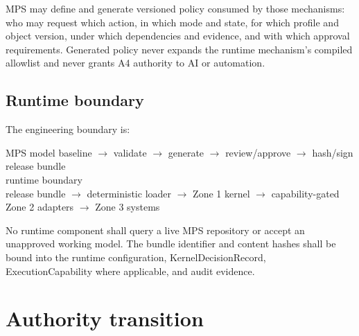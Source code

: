 \documentclass[11pt,letterpaper]{article}
\begin{document}
MPS may define and generate versioned policy consumed by those mechanisms: who may request which action, in which mode and state, for which profile and object version, under which dependencies and evidence, and with which approval requirements. Generated policy never expands the runtime mechanism's compiled allowlist and never grants A4 authority to AI or automation.

\subsection{Runtime boundary}

The engineering boundary is:

\begin{center}
\begin{minipage}{0.90\textwidth}
\ttfamily\small
MPS model baseline $\rightarrow$ validate $\rightarrow$ generate $\rightarrow$ review/approve $\rightarrow$ hash/sign release bundle\\
\hfill runtime boundary\\
release bundle $\rightarrow$ deterministic loader $\rightarrow$ Zone 1 kernel $\rightarrow$ capability-gated Zone 2 adapters $\rightarrow$ Zone 3 systems
\end{minipage}
\end{center}

No runtime component shall query a live MPS repository or accept an unapproved working model. The bundle identifier and content hashes shall be bound into the runtime configuration, KernelDecisionRecord, ExecutionCapability where applicable, and audit evidence.

\section{Authority transition}
\end{document}
